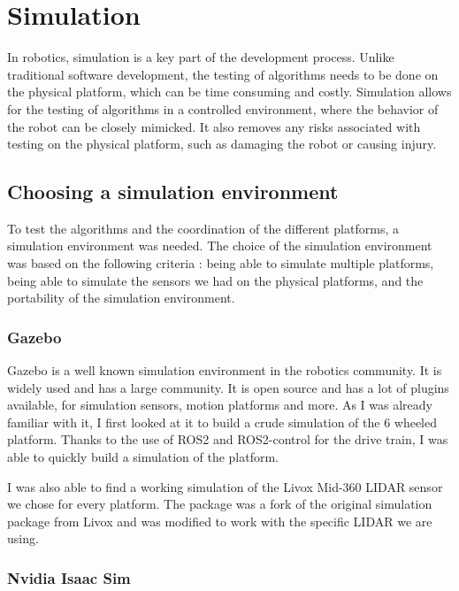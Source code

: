 \documentclass[11pt]{article}
\begin{document}
    
\newpage
\section{Simulation}

    In robotics, simulation is a key part of the development process. Unlike traditional software development, the testing of algorithms needs to be done on the physical platform, which can be time consuming and costly. Simulation allows for the testing of algorithms in a controlled environment, where the behavior of the robot can be closely mimicked. It also removes any risks associated with testing on the physical platform, such as damaging the robot or causing injury. 

    \subsection{Choosing a simulation environment}

        To test the algorithms and the coordination of the different platforms, a simulation environment was needed. The choice of the simulation environment was based on the following criteria : being able to simulate multiple platforms, being able to simulate the sensors we had on the physical platforms, and the portability of the simulation environment.


        \subsubsection{Gazebo}
            Gazebo is a well known simulation environment in the robotics community. It is widely used and has a large community. It is open source and has a lot of plugins available, for simulation sensors, motion platforms and more. As I was already familiar with it, I first looked at it to build a crude simulation of the 6 wheeled platform. Thanks to the use of ROS2 and ROS2-control for the drive train, I was able to quickly build a simulation of the platform. 

            I was also able to find a working simulation of the Livox Mid-360 LIDAR sensor we chose for every platform. The package \cite{livox_lidar_simulation_fork} was a fork of the original simulation package from Livox \cite{livox_laser_simulation} and was modified to work with the specific LIDAR we are using.
            
            

        \subsubsection{Nvidia Isaac Sim}
\end{document}
